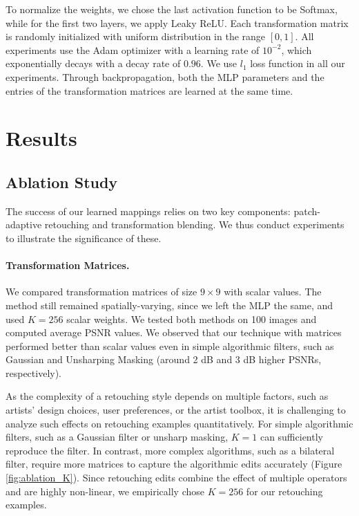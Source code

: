 To normalize the weights, we chose the last activation function to be Softmax, while for the first two layers, we apply Leaky ReLU. Each transformation matrix is randomly initialized with uniform distribution in the range $[0, 1]$. All experiments use the Adam optimizer with a learning rate of $10^{-2}$, which exponentially decays with a decay rate of $0.96$. We use $l_1$ loss function in all our experiments. Through backpropagation, both the MLP parameters and the entries of the transformation matrices are learned at the same time.

\section{Results}
\label{sec:results}


\subsection{Ablation Study}\label{ablation}
The success of our learned mappings relies on two key components: patch-adaptive retouching and transformation blending. We thus conduct experiments to illustrate the significance of these.

\paragraph{Transformation Matrices.} We compared transformation matrices of size $9 \times 9$ with scalar values. The method still remained spatially-varying, since we left the MLP the same, and used $K=256$ scalar weights. We tested both methods on 100 images and computed average PSNR values. We observed that our technique with matrices performed better than scalar values even in simple algorithmic filters, such as Gaussian and Unsharping Masking (around 2 dB and 3 dB higher PSNRs, respectively). 


As the complexity of a retouching style depends on multiple factors, such as artists’ design choices, user preferences, or the artist toolbox, it is challenging to analyze such effects on retouching examples quantitatively. For simple algorithmic filters, such as a Gaussian filter or unsharp masking, $K=1$ can sufficiently reproduce the filter. In contrast, more complex algorithms, such as a bilateral filter, require more matrices to capture the algorithmic edits accurately (Figure \ref{fig:ablation_K}). Since retouching edits combine the effect of multiple operators and are highly non-linear, we empirically chose $K=256$ for our retouching examples. 

